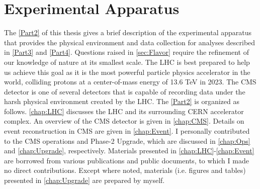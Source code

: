 \part{Experimental Apparatus}
\label{Part2}
The \autoref{Part2} of this thesis gives a brief description of the experimental apparatus that provides the physical environment and data collection for analyses described in \autoref{Part3} and \autoref{Part4}. Questions raised in \autoref{sec:Flavor} require the refinement of our knowledge of nature at its smallest scale. The \ac{LHC} is best prepared to help us achieve this goal as it is the most powerful particle physics accelerator in the world, colliding protons at a center-of-mass energy of 13.6 TeV in 2023. The \ac{CMS} detector is one of several detectors that is capable of recording data under the harsh physical environment created by the \ac{LHC}. The \autoref{Part2} is organized as follows. \autoref{chap:LHC} discusses the \ac{LHC} and its surrounding \ac{CERN} accelerator complex. An overview of the \ac{CMS} detector is given in \autoref{chap:CMS}. Details on event reconstruction in \ac{CMS} are given in \autoref{chap:Event}. I personally contributed to the \ac{CMS} operations and Phase-2 Upgrade, which are discussed in \autoref{chap:Ops} and \autoref{chap:Upgrade}, respectively. Materials presented in \autoref{chap:LHC}-\autoref{chap:Event} are borrowed from various publications and public documents, to which I made no direct contributions. Except where noted, materials (i.e. figures and tables) presented in \autoref{chap:Upgrade} are prepared by myself.






